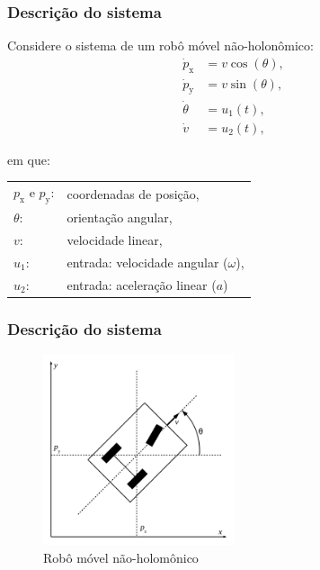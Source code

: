 \documentclass{beamer}
\begin{document}
\begin{frame}
	\frametitle{Descrição do sistema}
	Considere o sistema de um robô móvel não-holonômico:
	\begin{equation*}
		\begin{split}
		\dot{p}_{\textrm{x}} & = v\cos (\theta),\\
		\dot{p}_{\textrm{y}} & = v\sin (\theta),\\
		\dot{\theta}  & = u_1(t),\\
		\dot{v} & = u_2(t),
		\end{split}
	\end{equation*}
	
	em que:
	
	\centering

	\begin{tabular}{l l}
		\hfill
		$p_{\textrm{x}}$ e $p_{\textrm{y}}$:	& coordenadas de posição, \\
		\hfill
		$\theta$:  							& orientação angular, \\
		\hfill
		$v$:								& velocidade linear, \\
		\hfill
		$u_1$:	 							& entrada: velocidade angular ($\omega$), \\
		\hfill
		$u_2$:	 							& entrada: aceleração linear ($a$)
	\end{tabular}
	

\end{frame}


\begin{frame}
	\frametitle{Descrição do sistema}
	
	\begin{figure}
		\centering
		\caption{Robô móvel não-holomônico}
		\includegraphics[width=0.5\textwidth]{images/Nonholomonic-robot.pdf}
	\end{figure}
	
\end{frame}
\end{document}
